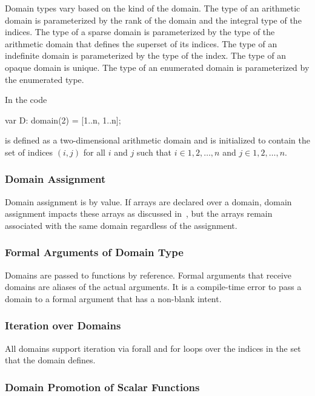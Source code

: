 Domain types vary based on the kind of the domain.  The type of an
arithmetic domain is parameterized by the rank of the domain and the
integral type of the indices.  The type of a sparse domain is
parameterized by the type of the arithmetic domain that defines the
superset of its indices.  The type of an indefinite domain is
parameterized by the type of the index.  The type of an opaque domain
is unique.  The type of an enumerated domain is parameterized by the
enumerated type.

\begin{example}
In the code
\begin{chapel}
var D: domain(2) = [1..n, 1..n];
\end{chapel}
 is defined as a two-dimensional arithmetic domain and is
initialized to contain the set of indices $(i,j)$ for all $i$ and $j$
such that $i \in {1, 2, \ldots, n}$ and $j \in {1, 2, \ldots, n}$.
\end{example}

\subsubsection{Domain Assignment}
\label{Domain_Assignment}

Domain assignment is by value.  If arrays are declared over a domain,
domain assignment impacts these arrays as discussed
in~, but the arrays remain
associated with the same domain regardless of the assignment.

\subsubsection{Formal Arguments of Domain Type}
\label{Formal_Arguments_of_Domain_Type}

Domains are passed to functions by reference.  Formal arguments that
receive domains are aliases of the actual arguments.  It is a
compile-time error to pass a domain to a formal argument that has a
non-blank intent.

\subsubsection{Iteration over Domains}
\label{Iteration_over_Domains}

All domains support iteration via forall and for loops over the
indices in the set that the domain defines.

\subsubsection{Domain Promotion of Scalar Functions}
\label{Domain_Promotion_of_Scalar_Functions}

